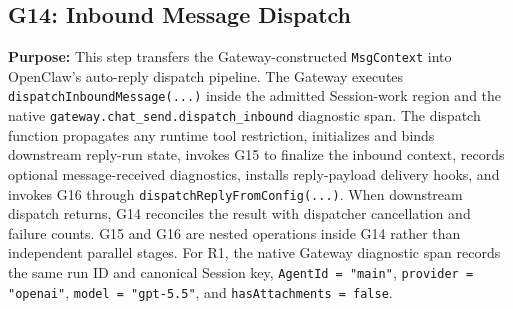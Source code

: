 
\subsection*{G14: Inbound Message Dispatch}

\textbf{Purpose:}
This step transfers the Gateway-constructed \texttt{MsgContext} into
OpenClaw's auto-reply dispatch pipeline. The Gateway executes
\texttt{dispatchInboundMessage(...)} inside the admitted
Session-work region and the native
\texttt{gateway.chat\_send.dispatch\_inbound} diagnostic span.
The dispatch function propagates any runtime tool restriction,
initializes and binds downstream reply-run state, invokes G15 to
finalize the inbound context, records optional message-received
diagnostics, installs reply-payload delivery hooks, and invokes G16
through \texttt{dispatchReplyFromConfig(...)}. When downstream dispatch
returns, G14 reconciles the result with dispatcher cancellation and
failure counts. G15 and G16 are nested operations inside G14 rather
than independent parallel stages. For R1, the native Gateway
diagnostic span records the same run ID and canonical Session key,
\texttt{AgentId = "main"}, \texttt{provider = "openai"},
\texttt{model = "gpt-5.5"}, and \texttt{hasAttachments = false}.

